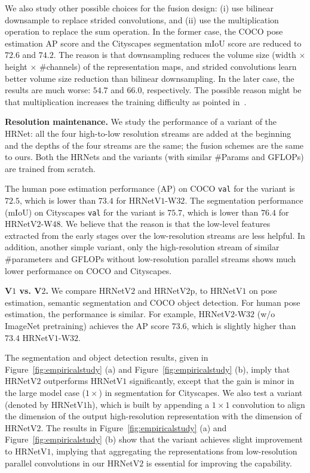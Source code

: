 \documentclass[10pt,journal,compsoc]{IEEEtran}
\begin{document}
{
We also study other possible choices 
for the fusion design:
(i) use bilinear downsample to replace strided convolutions,
and (ii) use the multiplication operation 
to replace the sum operation.
In the former case,
the COCO pose estimation AP score
and the Cityscapes segmentation mIoU score
are reduced to $72.6$ and $74.2$.
The reason is that downsampling reduces the volume size
(width $\times$ height $\times$ \#channels) of the representation maps, and strided convolutions learn better volume size reduction than bilinear downsampling.
In the later case,
the results are much worse:
$54.7$ and $66.0$, respectively.
The possible reason might be that multiplication
increases the training difficulty as pointed in~\cite{WangXLQZZTY17}.
}

\vspace{.1cm}
\noindent\textbf{Resolution maintenance.}
We study the performance of
a variant of the HRNet:
all the four high-to-low resolution streams are added at the beginning
and the depths of the four streams are the same; 
the fusion schemes are the same to ours.
Both the HRNets and the variants
(with similar \#Params and GFLOPs)
are trained from scratch.

The human pose estimation performance
(AP) on COCO \texttt{val}
for the variant is $72.5$, which is lower than $73.4$ for HRNetV$1$-W$32$.
The segmentation performance (mIoU)
on Cityscapes \texttt{val}
for the variant 
is $75.7$, which is lower than $76.4$ for HRNetV$2$-W$48$.
We believe that the reason is that
the low-level features extracted from the early stages
over the low-resolution streams
are less helpful.
In addition, 
another simple variant,
only the high-resolution stream
of similar \#parameters and GFLOPs
without low-resolution parallel streams
shows much lower performance on COCO and Cityscapes.







	
\vspace{.1cm}
\noindent\textbf{V$1$ vs. V$2$.}
We compare HRNetV$2$ and HRNetV$2$p,
to HRNetV$1$
on pose estimation, semantic segmentation and COCO object detection.
For human pose estimation,
the performance is similar. 
For example,
HRNetV$2$-W$32$ (w/o ImageNet pretraining) 
achieves the AP score $73.6$, 
which is slightly higher than $73.4$ HRNetV$1$-W$32$.

The segmentation and object detection results, given in 
Figure~\ref{fig:empiricalstudy} (a)
and Figure~\ref{fig:empiricalstudy} (b),
imply that HRNetV$2$ outperforms HRNetV$1$ significantly,
except that
the gain is minor
in the large model case ($1\times$)
in segmentation for Cityscapes.
We also test a variant
(denoted by HRNetV$1$h),
which is built by appending a $1\times 1$ convolution to 
align the dimension of the output high-resolution representation
with the dimension of HRNetV$2$.
The results in Figure~\ref{fig:empiricalstudy} (a) and Figure~\ref{fig:empiricalstudy} (b)
show that the variant achieves slight improvement
to HRNetV$1$,
implying that aggregating the representations
from low-resolution parallel convolutions in our HRNetV$2$ 
is essential for improving the capability.
\end{document}
